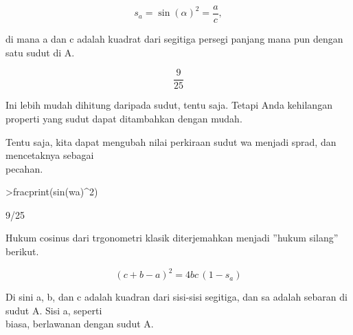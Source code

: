 \documentclass[12pt,Times new roman,letterpaper]{book}
\begin{document}
\begin{eulernootebook}
\begin{eulercomment}
\begin{eulercomment}
\begin{eulernootebook}
\begin{eulercomment}
\begin{eulercomment}
\begin{eulercomment}
\begin{eulercomment}
\begin{eulercomment}
\begin{eulercomment}
\begin{eulernotebook}
\begin{eulercomment}
\begin{eulercomment}
\begin{eulercomment}
\begin{eulercomment}
\end{eulercomment}
\begin{eulerformula}
\[
s_a = \sin(\alpha)^2 = \frac{a}{c},
\]
\end{eulerformula}
\begin{eulercomment}
di mana a dan c adalah kuadrat dari segitiga persegi panjang mana pun
dengan satu sudut di A.
\end{eulercomment}
\begin{eulerformula}
\[
\frac{9}{25}
\]
\end{eulerformula}
\begin{eulercomment}
Ini lebih mudah dihitung daripada sudut, tentu saja. Tetapi Anda
kehilangan properti yang sudut dapat ditambahkan dengan mudah.

Tentu saja, kita dapat mengubah nilai perkiraan sudut wa menjadi
sprad, dan mencetaknya sebagai\\
pecahan.
\end{eulercomment}
\begin{eulerprompt}
>fracprint(sin(wa)^2)
\end{eulerprompt}
\begin{euleroutput}
  9/25
\end{euleroutput}
\begin{eulercomment}
Hukum cosinus dari trgonometri klasik diterjemahkan menjadi ”hukum
silang” berikut.

\end{eulercomment}
\begin{eulerformula}
\[
(c+b-a)^2 = 4 b c \, (1-s_a)
\]
\end{eulerformula}
\begin{eulercomment}
Di sini a, b, dan c adalah kuadran dari sisi-sisi segitiga, dan sa
adalah sebaran di sudut A. Sisi a, seperti\\
biasa, berlawanan dengan sudut A.


\end{eulercomment}
\end{eulercomment}
\end{eulercomment}
\end{eulercomment}
\end{eulernotebook}
\end{eulercomment}
\end{eulercomment}
\end{eulercomment}
\end{eulercomment}
\end{eulercomment}
\end{eulercomment}
\end{eulernootebook}
\end{eulercomment}
\end{eulercomment}
\end{eulernootebook}
\end{document}
